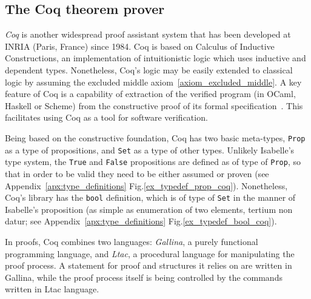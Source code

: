 \documentclass[article]{aaltoseries}
\begin{document}


\subsection{The Coq theorem prover}
\label{sec:prover_coq}

\textit{Coq} is another widespread proof assistant system that has been developed at INRIA (Paris, France) since 1984. Coq is based on Calculus of Inductive Constructions, an implementation of intuitionistic logic which uses inductive and dependent types. Nonetheless, Coq's logic may be easily extended to classical logic by assuming the excluded middle axiom~\eqref{axiom_excluded_middle}. A key feature of Coq is a capability of extraction of the verified program (in OCaml, Haskell or Scheme) from the constructive proof of its formal specification~\cite{Letouzey08}. This facilitates using Coq as a tool for software verification.

Being based on the constructive foundation, Coq has two basic meta-types, \texttt{Prop} as a type of propositions, and \texttt{Set} as a type of other types.
Unlikely Isabelle's type system, the \texttt{True} and \texttt{False} propositions are defined as of type of \texttt{Prop}, so that in order to be valid they need to be either assumed or proven (see Appendix~\ref{apx:type_definitions} Fig.\ref{ex_typedef_prop_coq}). Nonetheless, Coq's library has the \texttt{bool} definition, which is of type of \texttt{Set} in the manner of Isabelle's proposition (as simple as enumeration of two elements, tertium non datur; see Appendix~\ref{apx:type_definitions} Fig.\ref{ex_typedef_bool_coq}).



In proofs, Coq combines two languages: \textit{Gallina}, a purely functional programming language, and \textit{Ltac}, a procedural language for manipulating the proof process. A statement for proof and structures it relies on are written in Gallina, while the proof process itself is being controlled by the commands written in Ltac language.

\end{document}
